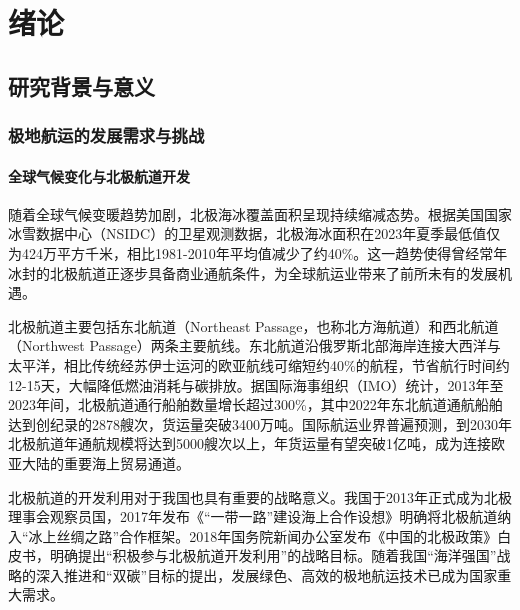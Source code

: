 \documentclass[12pt,a4paper]{ctexbook}
\begin{document}
\listoftables
{}

\newpage

\mainmatter
\pagestyle{fancy}
\fancyhf{}
\fancyhead[CO]{\small\leftmark}
\fancyfoot[C]{\thepage}
\renewcommand{\headrulewidth}{0.4pt}

\chapter{绪论}

\section{研究背景与意义}

\subsection{极地航运的发展需求与挑战}

\subsubsection{全球气候变化与北极航道开发}

随着全球气候变暖趋势加剧，北极海冰覆盖面积呈现持续缩减态势。根据美国国家冰雪数据中心（NSIDC）的卫星观测数据，北极海冰面积在2023年夏季最低值仅为424万平方千米，相比1981-2010年平均值减少了约40\%。这一趋势使得曾经常年冰封的北极航道正逐步具备商业通航条件，为全球航运业带来了前所未有的发展机遇。

北极航道主要包括东北航道（Northeast Passage，也称北方海航道）和西北航道（Northwest Passage）两条主要航线。东北航道沿俄罗斯北部海岸连接大西洋与太平洋，相比传统经苏伊士运河的欧亚航线可缩短约40\%的航程，节省航行时间约12-15天，大幅降低燃油消耗与碳排放。据国际海事组织（IMO）统计，2013年至2023年间，北极航道通行船舶数量增长超过300\%，其中2022年东北航道通航船舶达到创纪录的2878艘次，货运量突破3400万吨。国际航运业界普遍预测，到2030年北极航道年通航规模将达到5000艘次以上，年货运量有望突破1亿吨，成为连接欧亚大陆的重要海上贸易通道。

北极航道的开发利用对于我国也具有重要的战略意义。我国于2013年正式成为北极理事会观察员国，2017年发布《``一带一路''建设海上合作设想》明确将北极航道纳入``冰上丝绸之路''合作框架。2018年国务院新闻办公室发布《中国的北极政策》白皮书，明确提出``积极参与北极航道开发利用''的战略目标。随着我国``海洋强国''战略的深入推进和``双碳''目标的提出，发展绿色、高效的极地航运技术已成为国家重大需求。
\end{document}
